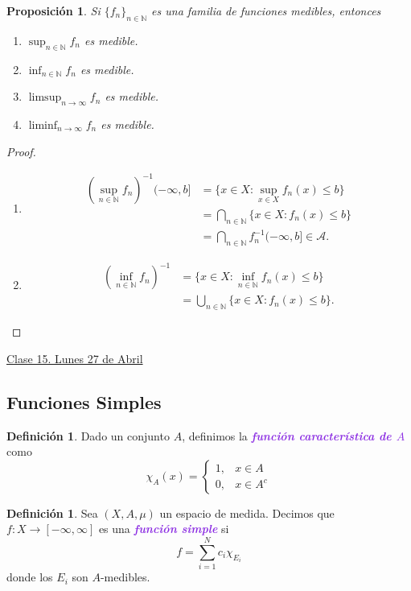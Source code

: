 \documentclass{article}
\newtheorem{proposition}[theorem]{Proposición}
\theoremstyle{definition}
\newtheorem{definition}[theorem]{Definición}
\theoremstyle{remark}
\numberwithin{equation}{section}
\newcommand{\A}{\mathcal{A}}
\newcommand{\N}{\mathbb{N}}
\newcommand{\oo}{\infty}
\newcommand{\br}[1]{\left( #1 \right)}
\newcommand{\ds}{\displaystyle}
\newcommand{\wea}[1]{\textcolor{BlueViolet}{\textbf{\emph{#1}}}}
\newcommand{\fecha}[1]{\begin{flushright} \underline{#1} \end{flushright}}
\begin{document}
\begin{proposition}
  Si $\{f_n\}_{n \in \N}$ es una familia de funciones medibles, entonces
  \begin{enumerate}[(1)]
    \item $\ds \sup_{n\in\N} f_n$ es medible.
    \item $\ds \inf_{n\in\N} f_n$ es medible.
    \item $\ds \limsup_{n\to\oo} f_n$ es medible.
    \item $\ds \liminf_{n\to\oo} f_n$ es medible.
  \end{enumerate}
\end{proposition}
\begin{proof}
  \ \begin{enumerate}[(1)]
    \item 
    \begin{align*}
        \br{\sup_{n\in\N} f_n}^{-1}(-\oo,b]
        &= \{x \in X \colon \sup_{x \in X} f_n(x) \leq b\} \\
        &= \bigcap_{n\in\N} \{x \in X \colon f_n(x) \leq b\} \\
        &= \bigcap_{n\in\N} f_n^{-1}(-\oo,b] \in \A.
    \end{align*}
    \item 
    \begin{align*}
        \br{\inf_{n\in\N} f_n}^{-1}
        &= \{x \in X \colon \inf_{n\in\N} f_n(x) \leq b\} \\
        &= \bigcup_{n\in\N} \{x \in X \colon f_n(x) \leq b\}.
    \end{align*}
    
  \end{enumerate}
\end{proof}

\newpage
\fecha{Clase 15. Lunes 27 de Abril}
\subsection{Funciones Simples}

\begin{definition}
  Dado un conjunto $A$, definimos la \wea{función característica de $A$} como 
  \[ \chi_A(x) = \begin{cases}
    1, &x \in A \\
    0, &x \in A^c
  \end{cases} \]
\end{definition}

\begin{definition}
  Sea $(X,A,\mu)$ un espacio de medida. Decimos que $f \colon X \to [-\oo,\oo]$ es una \wea{función simple} si 
  \[ f = \sum_{i=1}^N c_i \chi_{E_i} \]
  donde los $E_i$ son $A$-medibles.
\end{definition}
\end{document}
